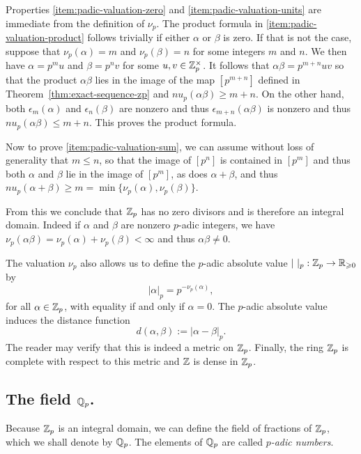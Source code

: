 \smallskip

Properties \ref{item:padic-valuation-zero} and \ref{item:padic-valuation-units} are immediate from the definition of \(\nu_p\). The product formula in \ref{item:padic-valuation-product} follows trivially if either \(\alpha\) or \(\beta\) is zero. If that is not the case, suppose that \(\nu_p(\alpha) = m\) and \(\nu_p(\beta) = n\) for some integers \(m\) and \(n\). We then have \(\alpha = p^mu\) and \(\beta = p^nv\) for some \(u, v \in \mathbb{Z}_p^{\times}\). It follows that \(\alpha\beta = p^{m + n}uv\) so that the product \(\alpha\beta\) lies in the image of the map \([p^{m+n}]\) defined in Theorem~\ref{thm:exact-sequence-zp} and \(nu_p(\alpha\beta) \geq m + n\). On the other hand, both \(\epsilon_m(\alpha)\) and \(\epsilon_n(\beta)\) are nonzero and thus \(\epsilon_{m+n}(\alpha\beta)\) is nonzero and thus \(nu_p(\alpha\beta) \leq m + n\). This proves the product formula.

Now to prove \ref{item:padic-valuation-sum}, we can assume without loss of generality that \(m \leq n\), so that the image of \([p^n]\) is contained in \([p^m]\) and thus both \(\alpha\) and \(\beta\) lie in the image of \([p^m]\), as does \(\alpha + \beta\), and thus \(nu_p(\alpha + \beta) \geq m = \min\{\nu_p(\alpha), \nu_p(\beta)\}\).

From this we conclude that \(\mathbb{Z}_p\) has no zero divisors and is therefore an integral domain. Indeed if \(\alpha\) and \(\beta\) are nonzero \(p\)-adic integers, we have \(\nu_p(\alpha\beta) = \nu_p(\alpha) + \nu_p(\beta) < \infty\) and thus \(\alpha\beta \neq 0\).

The valuation \(\nu_p\) also allows us to define the \(p\)-adic absolute value \(|\ |_p : \mathbb{Z}_p \to \mathbb{R}_{\geqslant 0}\) by
\[
  |\alpha|_p = p^{-\nu_p(\alpha)},
\]
for all \(\alpha \in \mathbb{Z}_p\), with equality if and only if \(\alpha = 0\). The \(p\)-adic absolute value induces the distance function
\[
  d(\alpha, \beta) := |\alpha - \beta|_p.
\]
The reader may verify that this is indeed a metric on \(\mathbb{Z}_p\). Finally, the ring \(\mathbb{Z}_p\) is complete with respect to this metric and \(\mathbb{Z}\) is dense in \(\mathbb{Z}_p\). \cite[p.~12]{serre2012course}

\subsection{The field \(\mathbb{Q}_p\).}\label{sec:qp-field-props}
Because \(\mathbb{Z}_p\) is an integral domain, we can define the field of fractions of \(\mathbb{Z}_p\), which we shall denote by \(\mathbb{Q}_p\). The elements of \(\mathbb{Q}_p\) are called \emph{\(p\)-adic numbers}.

